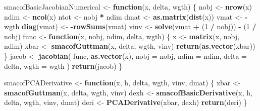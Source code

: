 \documentclass[
  12pt,
]{article}
\newenvironment{Shaded}{\begin{snugshade}}{\end{snugshade}}
\newcommand{\AttributeTok}[1]{\textcolor[rgb]{0.13,0.29,0.53}{#1}}
\newcommand{\ControlFlowTok}[1]{\textcolor[rgb]{0.13,0.29,0.53}{\textbf{#1}}}
\newcommand{\DecValTok}[1]{\textcolor[rgb]{0.00,0.00,0.81}{#1}}
\newcommand{\FunctionTok}[1]{\textcolor[rgb]{0.13,0.29,0.53}{\textbf{#1}}}
\newcommand{\NormalTok}[1]{#1}
\newcommand{\OtherTok}[1]{\textcolor[rgb]{0.56,0.35,0.01}{#1}}
\newcommand{\SpecialCharTok}[1]{\textcolor[rgb]{0.81,0.36,0.00}{\textbf{#1}}}
\begin{document}
\begin{Shaded}
\begin{Highlighting}[]
\NormalTok{smacofBasicJacobianNumerical }\OtherTok{\textless{}{-}} \ControlFlowTok{function}\NormalTok{(x, delta, wgth) \{}
\NormalTok{  nobj }\OtherTok{\textless{}{-}} \FunctionTok{nrow}\NormalTok{(x)}
\NormalTok{  ndim }\OtherTok{\textless{}{-}} \FunctionTok{ncol}\NormalTok{(x)}
\NormalTok{  ntot }\OtherTok{\textless{}{-}}\NormalTok{ nobj }\SpecialCharTok{*}\NormalTok{ ndim}
\NormalTok{  dmat }\OtherTok{\textless{}{-}} \FunctionTok{as.matrix}\NormalTok{(}\FunctionTok{dist}\NormalTok{(x))}
\NormalTok{  vmat }\OtherTok{\textless{}{-}} \SpecialCharTok{{-}}\NormalTok{wgth}
  \FunctionTok{diag}\NormalTok{(vmat) }\OtherTok{\textless{}{-}} \SpecialCharTok{{-}}\FunctionTok{rowSums}\NormalTok{(vmat)}
\NormalTok{  vinv }\OtherTok{\textless{}{-}} \FunctionTok{solve}\NormalTok{(vmat }\SpecialCharTok{+}\NormalTok{ (}\DecValTok{1} \SpecialCharTok{/}\NormalTok{ nobj)) }\SpecialCharTok{{-}}\NormalTok{ (}\DecValTok{1} \SpecialCharTok{/}\NormalTok{ nobj)}
\NormalTok{  func }\OtherTok{\textless{}{-}} \ControlFlowTok{function}\NormalTok{(x, nobj, ndim, delta, wgth) \{}
\NormalTok{    x }\OtherTok{\textless{}{-}} \FunctionTok{matrix}\NormalTok{(x, nobj, ndim)}
\NormalTok{    xbar }\OtherTok{\textless{}{-}} \FunctionTok{smacofGuttman}\NormalTok{(x, delta, wgth, vinv)}
    \FunctionTok{return}\NormalTok{(}\FunctionTok{as.vector}\NormalTok{(xbar))}
\NormalTok{  \}}
\NormalTok{  jacob }\OtherTok{\textless{}{-}} \FunctionTok{jacobian}\NormalTok{(}
\NormalTok{    func,}
    \FunctionTok{as.vector}\NormalTok{(x),}
    \AttributeTok{nobj =}\NormalTok{ nobj,}
    \AttributeTok{ndim =}\NormalTok{ ndim,}
    \AttributeTok{delta =}\NormalTok{ delta,}
    \AttributeTok{wgth =}\NormalTok{ wgth}
\NormalTok{  )}
  \FunctionTok{return}\NormalTok{(jacob)}
\NormalTok{\}}

\NormalTok{smacofPCADerivative }\OtherTok{\textless{}{-}} \ControlFlowTok{function}\NormalTok{(x, h, delta, wgth, vinv, dmat) \{}
\NormalTok{  xbar }\OtherTok{\textless{}{-}} \FunctionTok{smacofGuttman}\NormalTok{(x, delta, wgth, vinv)}
\NormalTok{  dexh }\OtherTok{\textless{}{-}} \FunctionTok{smacofBasicDerivative}\NormalTok{(x, h, delta, wgth, vinv, dmat)}
\NormalTok{  deri }\OtherTok{\textless{}{-}} \FunctionTok{PCADerivative}\NormalTok{(xbar, dexh)}
  \FunctionTok{return}\NormalTok{(deri)}
\NormalTok{\}}


\end{Highlighting}
\end{Shaded}
\end{document}

